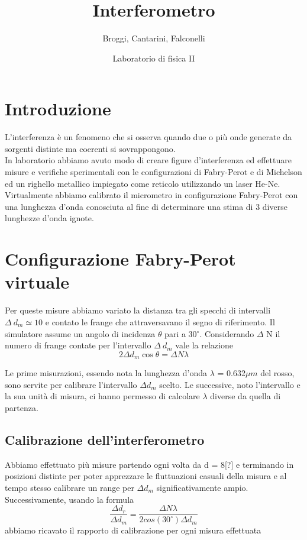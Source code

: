 \documentclass{article}
\title{Interferometro}
\author{Broggi, Cantarini, Falconelli}
\date{Laboratorio di fisica II}
\theoremstyle{definition}
\begin{document}
\maketitle

\section{Introduzione}

L'interferenza è un fenomeno che si osserva quando due o più onde generate da sorgenti distinte ma coerenti si sovrappongono. \\
In laboratorio abbiamo avuto modo di creare figure d'interferenza ed effettuare misure e verifiche sperimentali con le configurazioni di Fabry-Perot e di Michelson ed un righello metallico impiegato come reticolo utilizzando un laser He-Ne. Virtualmente abbiamo calibrato il micrometro in configurazione Fabry-Perot con una lunghezza d'onda conosciuta al fine di determinare una stima di 3 diverse lunghezze d'onda ignote.

\section{Configurazione Fabry-Perot virtuale}

Per queste misure abbiamo variato la distanza tra gli specchi di intervalli $\Delta\ d_{m} \simeq 10$ e contato le frange che attraversavano il segno di riferimento. 
Il simulatore assume un angolo di incidenza $\theta$ pari a 30$^{\circ}$.
Considerando $\Delta$ N il numero di frange contate per l'intervallo $\Delta\ d_{m}$ vale la relazione 
\[2\Delta d_{m} \cos \theta = \Delta N \lambda\]

Le prime misurazioni, essendo nota la lunghezza d'onda $\lambda$ = 0.632$\mu m$ del rosso, sono servite per calibrare l'intervallo $\Delta d_{m}$ scelto. Le successive, noto l'intervallo e la sua unità di misura, ci hanno permesso di calcolare $\lambda$ diverse da quella di partenza.
\pagebreak
\subsection{Calibrazione dell'interferometro}
Abbiamo effettuato più misure partendo ogni volta da d = 8[?] e terminando in posizioni distinte per poter apprezzare le fluttuazioni casuali della misura e al tempo stesso calibrare un range per \(\Delta d_{m}\) significativamente ampio.\\
Successivamente, usando la formula \\
\[\frac{\Delta d_{r}}{\Delta d_{m}} = \frac{\Delta N\lambda}{2cos(30^{\circ})\Delta d_{m}}\]
abbiamo ricavato il rapporto di calibrazione per ogni misura effettuata
\end{document}
